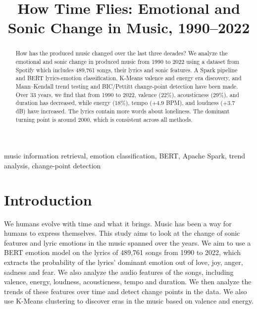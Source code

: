 \documentclass[conference]{IEEEtran}
\begin{document}
\title{How Time Flies: Emotional and Sonic Change in Music, 1990--2022}

\author{
}

\maketitle

\begin{abstract}
    How has the produced music changed over the last three decades? 
    We analyze the emotional and sonic change in produced music from 
    1990 to 2022 using a dataset from Spotify which includes 489{,}761
    songs, their lyrics and sonic features. A Spark pipeline and BERT 
    lyrics-emotion classification, K-Means valence and energy era 
    discovery, and Mann--Kendall trend testing and BIC/Pettitt change-point detection
    have been made. Over 33 years, we find that from 1990 to 2022, valence (22\%), 
    acousticness (29\%), and duration has decreased, while energy (18\%), 
    tempo (+4.9 BPM), and loudness (+3.7 dB) have increased. 
    The lyrics contain more words about loneliness. 
    The dominant turning point is around 2000, 
    which is consistent across all methods.
\end{abstract}

\begin{IEEEkeywords}
music information retrieval, emotion classification, BERT, Apache Spark, trend analysis, change-point detection
\end{IEEEkeywords}

\section{Introduction}

We humans evolve with time and what it brings. 
Music has been a way for humans to express themselves. 
This study aims to look at the change of sonic 
features and lyric emotions in the music spanned 
over the years. We aim to use a BERT emotion model on the lyrics 
of 489{,}761 songs from 1990 to 2022, which extracts 
the probability of the lyrics' dominant emotion 
out of love, joy, anger, sadness and fear. 
We also analyze the audio features of the songs, 
including valence, energy, loudness, acousticness, 
tempo and duration. We then analyze the trends of 
these features over time and detect change points in 
the data. We also use K-Means clustering to discover 
eras in the music based on valence and energy.
\end{document}
